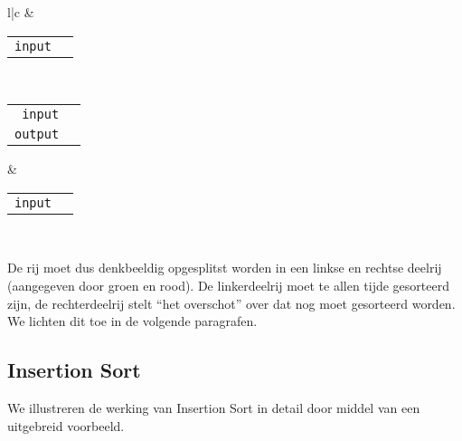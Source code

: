 \begin{center}
\begin{tabular}{l|c}
    &
    \begin{tabular}{rl}
      {\tt input} & \OUT{$\square\square\square\square$}\IN{$\square$}
    \end{tabular} \\
\hline
    \begin{tabular}{rl}
      {\tt input} & \IN{$$} \\
      {\tt output} & \OUT{$\square\square\square\square\square$}
    \end{tabular}
    &
    \begin{tabular}{rl}
      {\tt input} & \OUT{$\square\square\square\square\square$}\IN{$$}
    \end{tabular} \\
  \end{tabular}
\end{center}

De rij  moet dus denkbeeldig opgesplitst worden
in een linkse en rechtse deelrij (aangegeven door groen en rood).
De linkerdeelrij moet te allen tijde gesorteerd zijn, de rechterdeelrij
stelt ``het overschot'' over dat nog moet gesorteerd worden.
We lichten dit toe in de volgende paragrafen.

\subsection{Insertion Sort} \label{sec:sorteren:insertion-sort}
We illustreren de werking van Insertion Sort in detail door middel van een uitgebreid voorbeeld.

